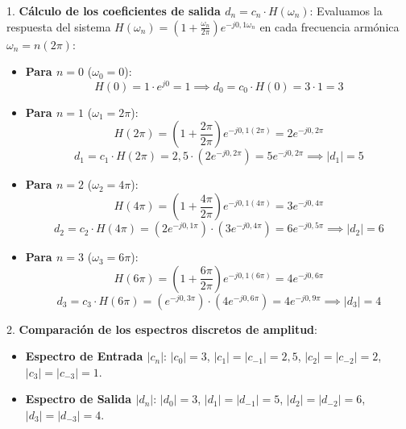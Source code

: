 \begin{resolucion}
1. \textbf{Cálculo de los coeficientes de salida $d_n = c_n \cdot H(\omega_n)$}:
   Evaluamos la respuesta del sistema $H(\omega_n) = \left(1 + \frac{\omega_n}{2\pi}\right) e^{-j 0{,}1 \omega_n}$ en cada frecuencia armónica $\omega_n = n(2\pi)$:
   \begin{itemize}
       \item \textbf{Para $n = 0$} ($\omega_0 = 0$):
         \[
         H(0) = 1 \cdot e^{j 0} = 1 \implies d_0 = c_0 \cdot H(0) = 3 \cdot 1 = 3
         \]
       \item \textbf{Para $n = 1$} ($\omega_1 = 2\pi$):
         \[
         H(2\pi) = \left(1 + \frac{2\pi}{2\pi}\right) e^{-j 0{,}1 (2\pi)} = 2 e^{-j 0{,}2\pi}
         \]
         \[
         d_1 = c_1 \cdot H(2\pi) = 2{,}5 \cdot \left( 2 e^{-j 0{,}2\pi} \right) = 5 e^{-j 0{,}2\pi} \implies |d_1| = 5
         \]
       \item \textbf{Para $n = 2$} ($\omega_2 = 4\pi$):
         \[
         H(4\pi) = \left(1 + \frac{4\pi}{2\pi}\right) e^{-j 0{,}1 (4\pi)} = 3 e^{-j 0{,}4\pi}
         \]
         \[
         d_2 = c_2 \cdot H(4\pi) = \left( 2 e^{-j 0{,}1\pi} \right) \cdot \left( 3 e^{-j 0{,}4\pi} \right) = 6 e^{-j 0{,}5\pi} \implies |d_2| = 6
         \]
       \item \textbf{Para $n = 3$} ($\omega_3 = 6\pi$):
         \[
         H(6\pi) = \left(1 + \frac{6\pi}{2\pi}\right) e^{-j 0{,}1 (6\pi)} = 4 e^{-j 0{,}6\pi}
         \]
         \[
         d_3 = c_3 \cdot H(6\pi) = \left( e^{-j 0{,}3\pi} \right) \cdot \left( 4 e^{-j 0{,}6\pi} \right) = 4 e^{-j 0{,}9\pi} \implies |d_3| = 4
         \]
   \end{itemize}

2. \textbf{Comparación de los espectros discretos de amplitud}:
   \begin{itemize}
       \item \textbf{Espectro de Entrada $|c_n|$}: $|c_0| = 3$, $|c_1| = |c_{-1}| = 2{,}5$, $|c_2| = |c_{-2}| = 2$, $|c_3| = |c_{-3}| = 1$.
       \item \textbf{Espectro de Salida $|d_n|$}: $|d_0| = 3$, $|d_1| = |d_{-1}| = 5$, $|d_2| = |d_{-2}| = 6$, $|d_3| = |d_{-3}| = 4$.
   \end{itemize}

\end{resolucion}

